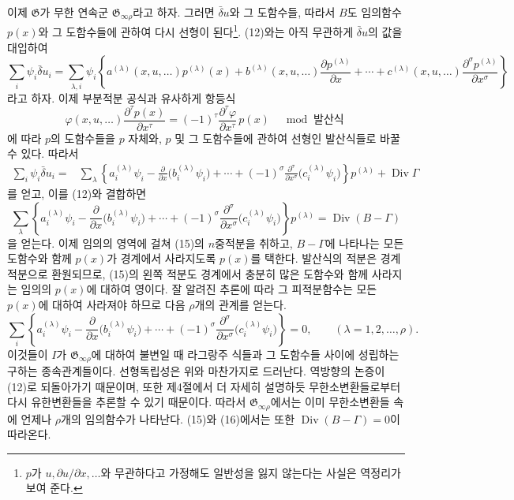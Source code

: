 이제 \(\mathfrak G\)가 무한 연속군 \(\mathfrak G_{\infty\rho}\)라고 하자. 그러면 \(\bar\delta u\)와 그 도함수들, 따라서 \(B\)도 임의함수 \(p(x)\)와 그 도함수들에 관하여 다시 선형이 된다\footnote{\(p\)가 \(u,\partial u/\partial x,\ldots\)와 무관하다고 가정해도 일반성을 잃지 않는다는 사실은 역정리가 보여 준다.}. (12)와는 아직 무관하게 \(\bar\delta u\)의 값을 대입하여
\[
\sum_i\psi_i\bar\delta u_i
=\sum_{\lambda,i}\psi_i\left\{
a^{(\lambda)}(x,u,\ldots)p^{(\lambda)}(x)
+b^{(\lambda)}(x,u,\ldots)
\frac{\partial p^{(\lambda)}}{\partial x}
+\cdots+c^{(\lambda)}(x,u,\ldots)
\frac{\partial^\sigma p^{(\lambda)}}{\partial x^\sigma}
\right\}
\]
라고 하자. 이제 부분적분 공식과 유사하게 항등식
\[
\varphi(x,u,\ldots)\frac{\partial^\tau p(x)}{\partial x^\tau}
=(-1)^\tau\frac{\partial^\tau\varphi}{\partial x^\tau}\,p(x)
\quad\bmod\text{ 발산식}
\]
에 따라 \(p\)의 도함수들을 \(p\) 자체와, \(p\) 및 그 도함수들에 관하여 선형인 발산식들로 바꿀 수 있다. 따라서
\begin{equation}
\tag{14}
\begin{aligned}
\sum_i\psi_i\bar\delta u_i
={}&\sum_\lambda\left\{
a_i^{(\lambda)}\psi_i
-\frac{\partial}{\partial x}\bigl(b_i^{(\lambda)}\psi_i\bigr)
+\cdots+(-1)^\sigma
\frac{\partial^\sigma}{\partial x^\sigma}
\bigl(c_i^{(\lambda)}\psi_i\bigr)
\right\}p^{(\lambda)}+\operatorname{Div}\Gamma
\end{aligned}
\end{equation}
를 얻고, 이를 (12)와 결합하면
\begin{equation}
\tag{15}
\sum_\lambda\left\{
a_i^{(\lambda)}\psi_i
-\frac{\partial}{\partial x}\bigl(b_i^{(\lambda)}\psi_i\bigr)
+\cdots+(-1)^\sigma
\frac{\partial^\sigma}{\partial x^\sigma}
\bigl(c_i^{(\lambda)}\psi_i\bigr)
\right\}p^{(\lambda)}
=\operatorname{Div}(B-\Gamma)
\end{equation}
을 얻는다. 이제 임의의 영역에 걸쳐 (15)의 \(n\)중적분을 취하고, \(B-\Gamma\)에 나타나는 모든 도함수와 함께 \(p(x)\)가 경계에서 사라지도록 \(p(x)\)를 택한다. 발산식의 적분은 경계적분으로 환원되므로, (15)의 왼쪽 적분도 경계에서 충분히 많은 도함수와 함께 사라지는 임의의 \(p(x)\)에 대하여 영이다. 잘 알려진 추론에 따라 그 피적분함수는 모든 \(p(x)\)에 대하여 사라져야 하므로 다음 \(\rho\)개의 관계를 얻는다.
\begin{equation}
\tag{16}
\sum_i\left\{
a_i^{(\lambda)}\psi_i
-\frac{\partial}{\partial x}\bigl(b_i^{(\lambda)}\psi_i\bigr)
+\cdots+(-1)^\sigma
\frac{\partial^\sigma}{\partial x^\sigma}
\bigl(c_i^{(\lambda)}\psi_i\bigr)
\right\}=0,
\qquad(\lambda=1,2,\ldots,\rho).
\end{equation}
이것들이 \(I\)가 \(\mathfrak G_{\infty\rho}\)에 대하여 불변일 때 라그랑주 식들과 그 도함수들 사이에 성립하는 구하는 종속관계들이다. 선형독립성은 위와 마찬가지로 드러난다. 역방향의 논증이 (12)로 되돌아가기 때문이며, 또한 제4절에서 더 자세히 설명하듯 무한소변환들로부터 다시 유한변환들을 추론할 수 있기 때문이다. 따라서 \(\mathfrak G_{\infty\rho}\)에서는 이미 무한소변환들 속에 언제나 \(\rho\)개의 임의함수가 나타난다. (15)와 (16)에서는 또한 \(\operatorname{Div}(B-\Gamma)=0\)이 따라온다.

